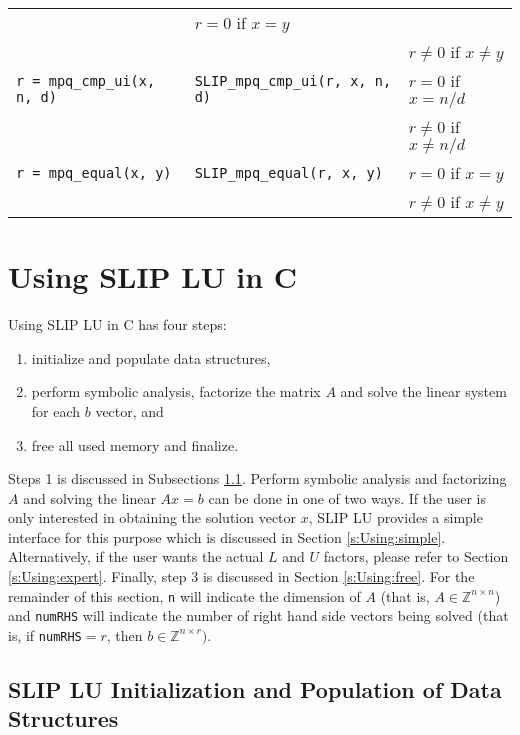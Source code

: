\documentclass[12pt]{article}
\theoremstyle{definition}
\begin{document}
{\begin{center}
\begin{tabular}{|l|l|l|}
    & $r = 0$ if $x=y$\\&&  $r\neq 0$ if $x\neq y$ \\ \hline
\verb|r = mpq_cmp_ui(x, n, d)|
    & \verb|SLIP_mpq_cmp_ui(r, x, n, d)|
    & $r = 0$ if $x=n/d$\\&& $r\neq 0$ if $x\neq n/d$ \\ \hline
\verb|r = mpq_equal(x, y)|
    & \verb|SLIP_mpq_equal(r, x, y)|
    & $r = 0$ if $x=y$\\&&  $r\neq 0$ if $x\neq y$ \\ \hline
\end{tabular}
\end{center}
}

\cprotect\section{Using SLIP LU in C} \label{s:Using}

Using SLIP LU in C has four steps:

\begin{enumerate}
\item initialize and populate data structures,
\item perform symbolic analysis,
factorize the matrix $A$ and solve the linear
system for each $b$ vector, and
\item free all used memory and finalize.
\end{enumerate}

Steps 1 is discussed in Subsections \ref{s:Using:init}.
Perform symbolic analysis and factorizing $A$ and solving the linear $A x =b$
can be done in one of two ways. If the user is only interested in
obtaining the solution vector $x$, SLIP LU provides a simple interface
for this purpose which is discussed in Section \ref{s:Using:simple}.
Alternatively, if the user wants the actual $L$ and $U$ factors, please refer
to Section \ref{s:Using:expert}. Finally, step 3 is discussed in Section
\ref{s:Using:free}. For the remainder of this section, \verb|n| will indicate
the dimension of $A$ (that is, $A \in \mathbb{Z}^{n \times n}$) and
\verb|numRHS| will indicate the number of right hand side vectors being solved
(that is, if \verb|numRHS|$= r$, then $b \in \mathbb{Z}^{n \times
r})$.

\cprotect\subsection{SLIP LU Initialization and Population of Data Structures}
\label{s:Using:init}
\end{document}
